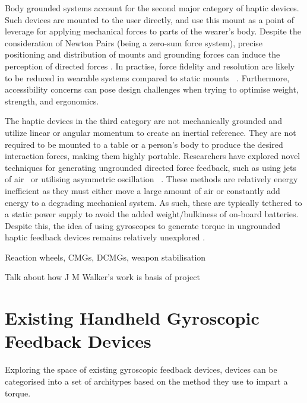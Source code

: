 \documentclass[a4paper]{article}
\begin{document}
Body grounded systems account for the second major category of haptic devices. Such devices are mounted to the user
directly, and use this mount as a point of leverage for applying mechanical forces to parts of the wearer's body.
Despite the consideration of Newton Pairs (being a zero-sum force system), precise positioning and distribution of
mounts and grounding forces can induce the perception of directed forces \cite{CITATIONHZT94l2057}. In practise, force
fidelity and resolution are likely to be reduced in wearable systems compared to static mounts
\cite{CITATIONGBa191l2057}\ \cite{CITATIONJBi17l2057}. Furthermore, accessibility concerns can pose design challenges
when trying to optimise weight, strength, and ergonomics.

The haptic devices in the third category are not mechanically grounded and utilize linear or angular momentum to create
an inertial reference. They are not required to be mounted to a table or a person's body to produce the desired
interaction forces, making them highly portable. Researchers have explored novel techniques for generating ungrounded
directed force feedback, such as using jets of air \cite{CITATIONHGu13l2057}\ or utilising asymmetric oscillation
\cite{CITATIONTAm08l2057}\ \cite{CITATIONVHa96l2057}. These methods are relatively energy inefficient as they must
either move a large amount of air or constantly add energy to a degrading mechanical system. As such, these are
typically tethered to a static power supply to avoid the added weight/bulkiness of on-board batteries. Despite this,
the idea of using gyroscopes to generate torque in ungrounded haptic feedback devices remains relatively unexplored
\cite{CITATIONHas19l2057}.


\bigskip


\bigskip

Reaction wheels, CMGs, DCMGs, weapon stabilisation

Talk about how J M Walker's work is basis of project

\section[Existing Handheld Gyroscopic Feedback Devices]{\textbf{Existing Handheld Gyroscopic Feedback Devices}}

\bigskip

Exploring the space of existing gyroscopic feedback devices, devices can be categorised into a set of architypes based
on the method they use to impart a torque. 
\end{document}
